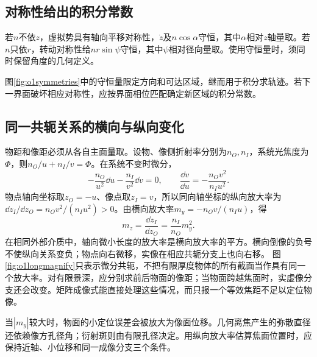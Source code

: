 \subsection{对称性给出的积分常数}
若$n$不依$z$，虚拟势具有轴向平移对称性，$\dot z$及$n\cos\alpha$守恒，其中$\alpha$相对$z$轴量取。若$n$只依$r$，转动对称性给$nr\sin\psi$守恒，其中$\psi$相对径向量取。使用守恒量时，须同时保留角度的几何定义。

图\ref{fig:o1symmetries}中的守恒量限定方向和可达区域，继而用于积分求轨迹。若下一界面破坏相应对称性，应按界面相位匹配确定新区域的积分常数。

\subsection{同一共轭关系的横向与纵向变化}
物距和像距必须从各自主面量取。设物、像侧折射率分别为$n_O,n_I$，系统光焦度为$\Phi$，则$n_O/u+n_I/v=\Phi$。在系统不变时微分，
\[
 -\frac{n_O}{u^2}\dd u-\frac{n_I}{v^2}\dd v=0,
 \qquad \frac{\dd v}{\dd u}=-\frac{n_Ov^2}{n_Iu^2}.
\]
物点轴向坐标取$z_O=-u$、像点取$z_I=v$，所以同向轴坐标的纵向放大率为$\dd z_I/\dd z_O=n_Ov^2/(n_Iu^2)>0$。由横向放大率$m_y=-n_Ov/(n_Iu)$，得
\[
 m_z=\frac{\dd z_I}{\dd z_O}=\frac{n_I}{n_O}m_y^2.
\]
在相同外部介质中，轴向微小长度的放大率是横向放大率的平方。横向倒像的负号不使纵向关系变负；物点向右微移，实像在相应共轭分支上也向右移。
图\ref{fig:o1longmagnify}只表示微分共轭，不把有限厚度物体的所有截面当作具有同一个放大率。对有限景深，应分别求前后物面的像距；当物面跨越焦面时，实虚像分支还会改变。矩阵成像式能直接处理这些情况，而只报一个等效焦距不足以定位物像。

当$|m_y|$较大时，物面的小定位误差会被放大为像面位移。几何离焦产生的弥散直径还依赖像方孔径角；衍射斑则由有限孔径决定。用纵向放大率估算焦面位置时，应保持近轴、小位移和同一成像分支三个条件。
